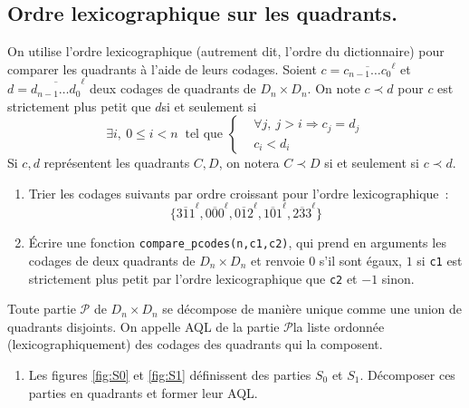 \subsection{Ordre lexicographique sur les quadrants.}
On utilise l'ordre lexicographique (autrement dit, l'ordre du dictionnaire) pour comparer les quadrants à l'aide de leurs codages.\newline
Soient $c=\overline{c_{n-1}\dots c_0}^\ell$ et $d=\overline{d_{n-1}\dots d_0}^\ell$ deux codages de quadrants de $D_n\times D_n$.
On note $c \prec d$ pour \og$c$ est strictement plus petit que $d$\fg si et seulement si
\[
\exists i,\ 0\leq i< n\ \text{ tel que }
\left\lbrace 
\begin{aligned}
 &\forall j,\ j>i\Rightarrow c_j=d_j \\ &c_i < d_i
\end{aligned}
\right. 
\]
Si $c, d$ représentent les quadrants $C,D$, on notera $C \prec D$ si et seulement si $c \prec d$. 
\begin{enumerate}[resume]
\item Trier les codages suivants par ordre croissant pour l'ordre lexicographique~:
\[\{\overline{311}^\ell,\overline{000}^\ell,\overline{012}^\ell,\overline{101}^\ell,\overline{233}^\ell\}\]
\item \'Ecrire une fonction {\tt compare\_pcodes(n,c1,c2)}, qui prend en arguments les codages de deux quadrants de $D_n\times D_n$ et renvoie $0$ s'il sont \'egaux, $1$ si {\tt c1} est strictement plus petit par l'ordre lexicographique que {\tt c2} et $-1$ sinon.
\end{enumerate}
Toute partie $\mathcal{P}$ de $D_n\times D_n$ se décompose de manière unique comme une union de quadrants disjoints. On appelle \og AQL de la partie $\mathcal{P}$\fg la liste ordonnée (lexicographiquement) des codages des quadrants qui la composent.

\begin{enumerate}[resume]
 \item Les figures \ref{fig:S0} et \ref{fig:S1} définissent des parties $S_0$ et $S_1$. Décomposer ces parties en quadrants et former leur AQL.
\end{enumerate}

